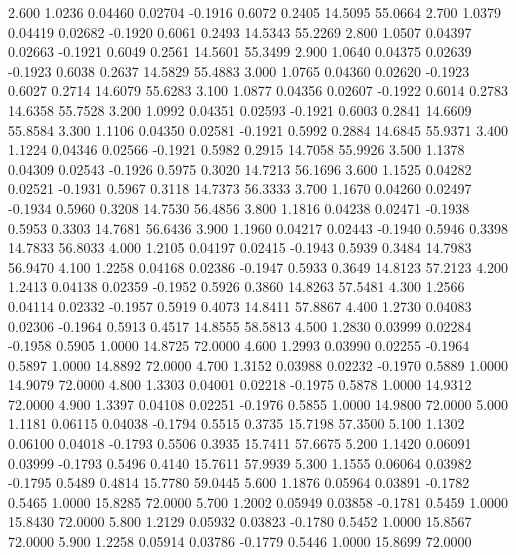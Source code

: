    2.600   1.0236   0.04460   0.02704  -0.1916   0.6072   0.2405  14.5095  55.0664
   2.700   1.0379   0.04419   0.02682  -0.1920   0.6061   0.2493  14.5343  55.2269
   2.800   1.0507   0.04397   0.02663  -0.1921   0.6049   0.2561  14.5601  55.3499
   2.900   1.0640   0.04375   0.02639  -0.1923   0.6038   0.2637  14.5829  55.4883
   3.000   1.0765   0.04360   0.02620  -0.1923   0.6027   0.2714  14.6079  55.6283
   3.100   1.0877   0.04356   0.02607  -0.1922   0.6014   0.2783  14.6358  55.7528
   3.200   1.0992   0.04351   0.02593  -0.1921   0.6003   0.2841  14.6609  55.8584
   3.300   1.1106   0.04350   0.02581  -0.1921   0.5992   0.2884  14.6845  55.9371
   3.400   1.1224   0.04346   0.02566  -0.1921   0.5982   0.2915  14.7058  55.9926
   3.500   1.1378   0.04309   0.02543  -0.1926   0.5975   0.3020  14.7213  56.1696
   3.600   1.1525   0.04282   0.02521  -0.1931   0.5967   0.3118  14.7373  56.3333
   3.700   1.1670   0.04260   0.02497  -0.1934   0.5960   0.3208  14.7530  56.4856
   3.800   1.1816   0.04238   0.02471  -0.1938   0.5953   0.3303  14.7681  56.6436
   3.900   1.1960   0.04217   0.02443  -0.1940   0.5946   0.3398  14.7833  56.8033
   4.000   1.2105   0.04197   0.02415  -0.1943   0.5939   0.3484  14.7983  56.9470
   4.100   1.2258   0.04168   0.02386  -0.1947   0.5933   0.3649  14.8123  57.2123
   4.200   1.2413   0.04138   0.02359  -0.1952   0.5926   0.3860  14.8263  57.5481
   4.300   1.2566   0.04114   0.02332  -0.1957   0.5919   0.4073  14.8411  57.8867
   4.400   1.2730   0.04083   0.02306  -0.1964   0.5913   0.4517  14.8555  58.5813
   4.500   1.2830   0.03999   0.02284  -0.1958   0.5905   1.0000  14.8725  72.0000
   4.600   1.2993   0.03990   0.02255  -0.1964   0.5897   1.0000  14.8892  72.0000
   4.700   1.3152   0.03988   0.02232  -0.1970   0.5889   1.0000  14.9079  72.0000
   4.800   1.3303   0.04001   0.02218  -0.1975   0.5878   1.0000  14.9312  72.0000
   4.900   1.3397   0.04108   0.02251  -0.1976   0.5855   1.0000  14.9800  72.0000
   5.000   1.1181   0.06115   0.04038  -0.1794   0.5515   0.3735  15.7198  57.3500
   5.100   1.1302   0.06100   0.04018  -0.1793   0.5506   0.3935  15.7411  57.6675
   5.200   1.1420   0.06091   0.03999  -0.1793   0.5496   0.4140  15.7611  57.9939
   5.300   1.1555   0.06064   0.03982  -0.1795   0.5489   0.4814  15.7780  59.0445
   5.600   1.1876   0.05964   0.03891  -0.1782   0.5465   1.0000  15.8285  72.0000
   5.700   1.2002   0.05949   0.03858  -0.1781   0.5459   1.0000  15.8430  72.0000
   5.800   1.2129   0.05932   0.03823  -0.1780   0.5452   1.0000  15.8567  72.0000
   5.900   1.2258   0.05914   0.03786  -0.1779   0.5446   1.0000  15.8699  72.0000
